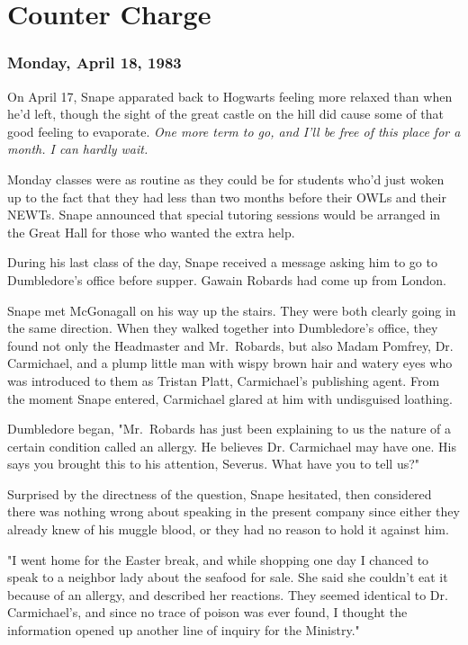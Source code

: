 
\chapter{Counter Charge}

\subsection{Monday, April 18, 1983}

On April 17, Snape apparated back to Hogwarts feeling more relaxed than when he'd left, though the sight of the great castle on the hill did cause some of that good feeling to evaporate. \emph{One more term to go, and I'll be free of this place for a month. I can hardly wait.}

Monday classes were as routine as they could be for students who'd just woken up to the fact that they had less than two months before their OWLs and their NEWTs. Snape announced that special tutoring sessions would be arranged in the Great Hall for those who wanted the extra help.

During his last class of the day, Snape received a message asking him to go to Dumbledore's office before supper. Gawain Robards had come up from London.

Snape met McGonagall on his way up the stairs. They were both clearly going in the same direction. When they walked together into Dumbledore's office, they found not only the Headmaster and Mr.~Robards, but also Madam Pomfrey, Dr. Carmichael, and a plump little man with wispy brown hair and watery eyes who was introduced to them as Tristan Platt, Carmichael's publishing agent. From the moment Snape entered, Carmichael glared at him with undisguised loathing.

Dumbledore began, "Mr.~Robards has just been explaining to us the nature of a certain condition called an allergy. He believes Dr. Carmichael may have one. His says you brought this to his attention, Severus. What have you to tell us?"

Surprised by the directness of the question, Snape hesitated, then considered there was nothing wrong about speaking in the present company since either they already knew of his muggle blood, or they had no reason to hold it against him.

"I went home for the Easter break, and while shopping one day I chanced to speak to a neighbor lady about the seafood for sale. She said she couldn't eat it because of an allergy, and described her reactions. They seemed identical to Dr. Carmichael's, and since no trace of poison was ever found, I thought the information opened up another line of inquiry for the Ministry."

